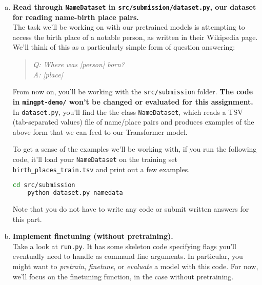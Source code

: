 \begin{enumerate}[(a)]
\item {} \textbf{Read through \texttt{NameDataset} in \texttt{src/submission/dataset.py}, our dataset for reading name-birth place pairs.}\\
The task we'll be working on with our pretrained models is attempting to access the birth place of a notable person, as written in their Wikipedia page.
We'll think of this as a particularly simple form of question answering:
\begin{quote}
    \textit{Q: Where was \textit{[person]} born?}\\
    \textit{A: [place]}
\end{quote}
From now on, you'll be working with the \texttt{src/submission} folder. \textbf{The code in \texttt{mingpt-demo/} won't be changed or evaluated for this assignment.}
In \texttt{dataset.py}, 
you'll find the the class \texttt{NameDataset}, which reads a TSV (tab-separated values) file of name/place pairs and produces examples of the above form that we can feed to our Transformer model.


To get a sense of the examples we'll be working with, if you run the following code, it'll load your \texttt{NameDataset} on the training set \texttt{birth\_places\_train.tsv} and print out a few examples.
\begin{lstlisting}[language=bash]
    cd src/submission
    python dataset.py namedata 
\end{lstlisting}

Note that you do not have to write any code or submit written answers for this part.

\item {} \textbf{Implement finetuning (without pretraining).}\\
Take a look at \texttt{run.py}. It has some skeleton code specifying flags you'll eventually need to handle as command line arguments.
In particular, you might want to \textit{pretrain}, \textit{finetune}, or \textit{evaluate} a model with this code. For now, we'll focus on the finetuning function, in the case without pretraining.


\end{enumerate}
